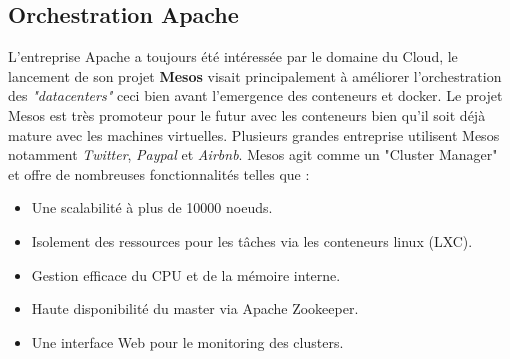 \begin{onehalfspace}
\section{Orchestration Apache}
L'entreprise Apache a toujours été intéressée par le domaine du Cloud, le lancement de son projet \textbf{Mesos} visait principalement à améliorer l'orchestration des \emph{"datacenters"} ceci bien avant l'emergence des conteneurs et docker. Le projet Mesos est très promoteur pour le futur avec les conteneurs bien qu'il soit déjà mature avec les machines virtuelles. Plusieurs grandes entreprise utilisent Mesos notamment \emph{Twitter}, \emph{Paypal} et \emph{Airbnb}.
Mesos agit comme un "Cluster Manager" et offre de nombreuses fonctionnalités telles que :
\begin{itemize}
\item Une scalabilité à plus de 10000 noeuds.
\item Isolement des ressources pour les tâches via les conteneurs linux (LXC).
\item Gestion efficace du CPU et de la mémoire interne.
\item Haute disponibilité du master via Apache Zookeeper.
\item Une interface Web pour le monitoring des clusters.
\end{itemize}

\end{onehalfspace}
